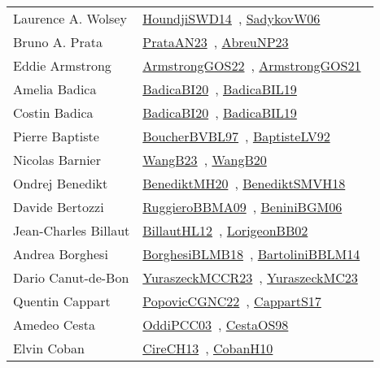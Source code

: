 {\begin{longtable}{p{4cm}p{20cm}}
Laurence A. Wolsey & \href{works/HoundjiSWD14.pdf}{HoundjiSWD14}~\cite{HoundjiSWD14}, \href{works/SadykovW06.pdf}{SadykovW06}~\cite{SadykovW06}\\
Bruno A. Prata & \href{works/PrataAN23.pdf}{PrataAN23}~\cite{PrataAN23}, \href{works/AbreuNP23.pdf}{AbreuNP23}~\cite{AbreuNP23}\\
Eddie Armstrong & \href{works/ArmstrongGOS22.pdf}{ArmstrongGOS22}~\cite{ArmstrongGOS22}, \href{works/ArmstrongGOS21.pdf}{ArmstrongGOS21}~\cite{ArmstrongGOS21}\\
Amelia Badica & \href{works/BadicaBI20.pdf}{BadicaBI20}~\cite{BadicaBI20}, \href{works/BadicaBIL19.pdf}{BadicaBIL19}~\cite{BadicaBIL19}\\
Costin Badica & \href{works/BadicaBI20.pdf}{BadicaBI20}~\cite{BadicaBI20}, \href{works/BadicaBIL19.pdf}{BadicaBIL19}~\cite{BadicaBIL19}\\
Pierre Baptiste & \href{}{BoucherBVBL97}~\cite{BoucherBVBL97}, \href{works/BaptisteLV92.pdf}{BaptisteLV92}~\cite{BaptisteLV92}\\
Nicolas Barnier & \href{works/WangB23.pdf}{WangB23}~\cite{WangB23}, \href{works/WangB20.pdf}{WangB20}~\cite{WangB20}\\
Ondrej Benedikt & \href{works/BenediktMH20.pdf}{BenediktMH20}~\cite{BenediktMH20}, \href{works/BenediktSMVH18.pdf}{BenediktSMVH18}~\cite{BenediktSMVH18}\\
Davide Bertozzi & \href{works/RuggieroBBMA09.pdf}{RuggieroBBMA09}~\cite{RuggieroBBMA09}, \href{works/BeniniBGM06.pdf}{BeniniBGM06}~\cite{BeniniBGM06}\\
Jean{-}Charles Billaut & \href{works/BillautHL12.pdf}{BillautHL12}~\cite{BillautHL12}, \href{works/LorigeonBB02.pdf}{LorigeonBB02}~\cite{LorigeonBB02}\\
Andrea Borghesi & \href{works/BorghesiBLMB18.pdf}{BorghesiBLMB18}~\cite{BorghesiBLMB18}, \href{works/BartoliniBBLM14.pdf}{BartoliniBBLM14}~\cite{BartoliniBBLM14}\\
Dario Canut{-}de{-}Bon & \href{works/YuraszeckMCCR23.pdf}{YuraszeckMCCR23}~\cite{YuraszeckMCCR23}, \href{works/YuraszeckMC23.pdf}{YuraszeckMC23}~\cite{YuraszeckMC23}\\
Quentin Cappart & \href{works/PopovicCGNC22.pdf}{PopovicCGNC22}~\cite{PopovicCGNC22}, \href{works/CappartS17.pdf}{CappartS17}~\cite{CappartS17}\\
Amedeo Cesta & \href{works/OddiPCC03.pdf}{OddiPCC03}~\cite{OddiPCC03}, \href{works/CestaOS98.pdf}{CestaOS98}~\cite{CestaOS98}\\
Elvin Coban & \href{works/CireCH13.pdf}{CireCH13}~\cite{CireCH13}, \href{works/CobanH10.pdf}{CobanH10}~\cite{CobanH10}\\

\end{longtable}}
